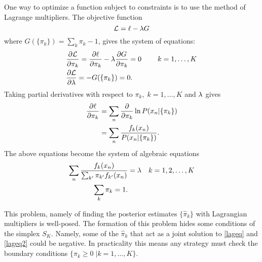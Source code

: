 One way to optimize a function subject to constraints is to use the method of Lagrange multipliers. The objective function 
\[\mathcal{L}=\ell-\lambda G\]
where $G(\{\pi_k\})=\sum_k \pi_k -1$, gives the system of equations:
\begin{align*}
&\pder1{\mathcal{L}}{\pi_k}=\pder1{\ell}{\pi_k}-\gl \pder1{G}{\pi_k}=0\qquad \; k=1,\ldots, K\\
&\pder1{\mathcal{L}}{\gl}=-G(\{\pi_k\})=0.
\end{align*}
Taking partial derivatives with respect to \( \pi_k,\;k=1,\ldots,K \) and \( \lambda \) gives
\begin{align*}
\pder1{\ell}{\pi_k}&=\sum_n \pder1{}{\pi_k}\ln P(x_n|\{\pi_k\})\\
&=\sum_n \frac{f_k(x_n)}{P(x_n|\{\pi_k\})}.
\end{align*}
The above equations become the system of algebraic equations
\begin{align}\label{lageq}
\sum_n\frac{f_k(x_n)}{\sum_{k'}\pi_{k'}f_{k'}(x_n)}&=\lambda&k=1,2,\ldots, K\\
\sum_k\pi_k=1.\label{lageq2}
\end{align}

This problem, namely of finding the posterior estimates $\{\hat{\pi}_k\}$ with Lagrangian multipliers is well-posed.  The formation of this problem hides some conditions of the simplex $S_K$.  Namely, some of the $\hat{\pi}_k$ that act as a joint solution to \eqref{lageq} and \eqref{lageq2} could be negative. In practicality this means any strategy must check the boundary conditions \( \{\pi_k\geq 0\; |k=1,\ldots,K \}   \).

